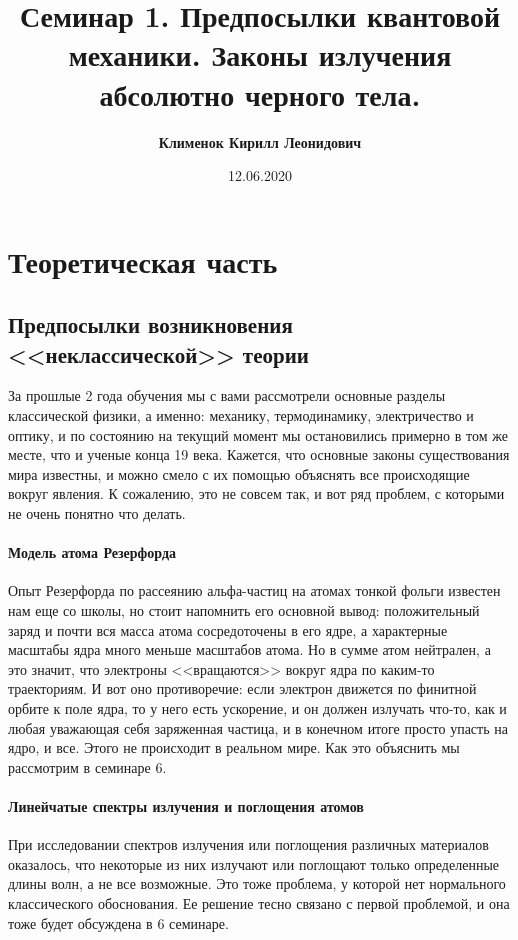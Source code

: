 \documentclass[12pt]{article}
\begin{document}
 
\title{\textbf{Семинар 1. Предпосылки квантовой механики. Законы излучения абсолютно черного тела.}}
\author{\textbf{Клименок Кирилл Леонидович}}
\date{12.06.2020}
\maketitle

\section{Теоретическая часть}

\subsection{Предпосылки возникновения <<неклассической>> теории}
За прошлые 2 года обучения мы с вами рассмотрели основные разделы классической физики, а именно: механику, термодинамику, электричество и оптику, и по состоянию на текущий момент мы остановились примерно в том же месте, что и ученые конца 19 века. Кажется, что основные законы существования мира известны, и можно смело с их помощью объяснять все происходящие вокруг явления. К сожалению, это не совсем так, и вот ряд проблем, с которыми не очень понятно что делать.

\paragraph{Модель атома Резерфорда}
Опыт Резерфорда по рассеянию альфа-частиц на атомах тонкой фольги известен нам еще со школы, но стоит напомнить его основной вывод: положительный заряд и почти вся масса атома сосредоточены в его ядре, а характерные масштабы ядра много меньше масштабов атома. Но в сумме атом нейтрален, а это значит, что электроны <<вращаются>> вокруг ядра по каким-то траекториям. И вот оно противоречие: если электрон движется по финитной орбите к поле ядра, то у него есть ускорение, и он должен излучать что-то, как и любая уважающая себя заряженная частица, и в конечном итоге просто упасть на ядро, и все. Этого не происходит в реальном мире. Как это объяснить мы рассмотрим в семинаре 6.

\paragraph{Линейчатые спектры излучения и поглощения атомов} 
При исследовании спектров излучения или поглощения различных материалов оказалось, что некоторые из них излучают или поглощают только определенные длины волн, а не все возможные. Это тоже проблема, у которой нет нормального классического обоснования. Ее решение тесно связано с первой проблемой, и она тоже будет обсуждена в 6 семинаре.
\end{document}
